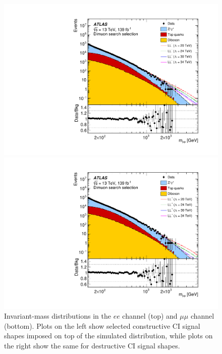 {\begin{figure}[h!]
\begin{minipage}[b]{.45\linewidth}
    \subcaption{}
\end{minipage} \\
\begin{minipage}[b]{.45\linewidth}
    \includegraphics[width=1\textwidth]{figures/ci/dataMc/figaux_06a.pdf}
    \subcaption{}
\end{minipage}
\begin{minipage}[b]{.45\linewidth}
    \includegraphics[width=1\textwidth]{figures/ci/dataMc/figaux_06b.pdf}
    \subcaption{}
\end{minipage}
\caption{Invariant-mass distributions in the $ee$ channel (top) and $\mu\mu$ channel (bottom). Plots on the left show selected constructive CI signal shapes imposed on top of the simulated distribution, while plots on the right show the same for destructive CI signal shapes.}
\label{fig:ciMassMcPlot}
\end{figure}
\clearpage
}

